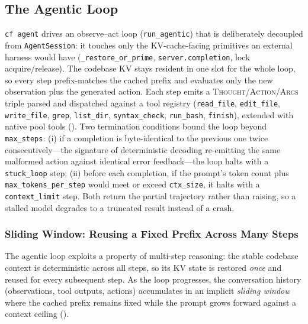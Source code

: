 \documentclass[10pt]{article}
\begin{document}
\subsection{The Agentic Loop}
\label{sec:agentic}
\texttt{cf agent} drives an observe--act loop (\texttt{run\_agentic}) that is
deliberately decoupled from \texttt{AgentSession}: it touches only the
KV-cache-facing primitives an external harness would have
(\texttt{\_restore\_or\_prime}, \texttt{server.completion}, lock acquire/release).
The codebase KV stays resident in one slot for the whole loop, so every step
prefix-matches the cached prefix and evaluates only the new observation plus the
generated action. Each step emits a \textsc{Thought}/\textsc{Action}/\textsc{Args}
triple parsed and dispatched against a tool registry
(\texttt{read\_file}, \texttt{edit\_file}, \texttt{write\_file}, \texttt{grep},
\texttt{list\_dir}, \texttt{syntax\_check}, \texttt{run\_bash}, \texttt{finish}),
extended with native pool tools (). Two termination conditions bound the loop beyond
\texttt{max\_steps}: (i) if a completion is byte-identical to the previous one
twice consecutively---the signature of deterministic decoding re-emitting the
same malformed action against identical error feedback---the loop halts with a
\texttt{stuck\_loop} step; (ii) before each completion, if the prompt's token
count plus \texttt{max\_tokens\_per\_step} would meet or exceed \texttt{ctx\_size},
it halts with a \texttt{context\_limit} step. Both return the partial trajectory
rather than raising, so a stalled model degrades to a truncated result instead of
a crash.

\subsubsection*{Sliding Window: Reusing a Fixed Prefix Across Many Steps}

The agentic loop exploits a property of multi-step reasoning: the stable
codebase context is deterministic across all steps, so its KV state is restored
\emph{once} and reused for every subsequent step. As the loop progresses, the
conversation history (observations, tool outputs, actions) accumulates in an
implicit \emph{sliding window} where the cached prefix remains fixed while the
prompt grows forward against a context ceiling ().
\end{document}
